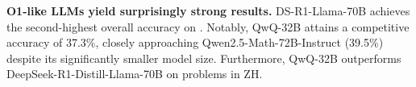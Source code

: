 \textbf{O1-like LLMs yield surprisingly strong results.}
DS-R1-Llama-70B achieves the second-highest overall accuracy on {\benchmark}. 
Notably, QwQ-32B attains a competitive accuracy of 37.3\%, closely approaching Qwen2.5-Math-72B-Instruct (39.5\%) despite its significantly smaller model size. 
Furthermore, QwQ-32B outperforms DeepSeek-R1-Distill-Llama-70B on problems in ZH.%

